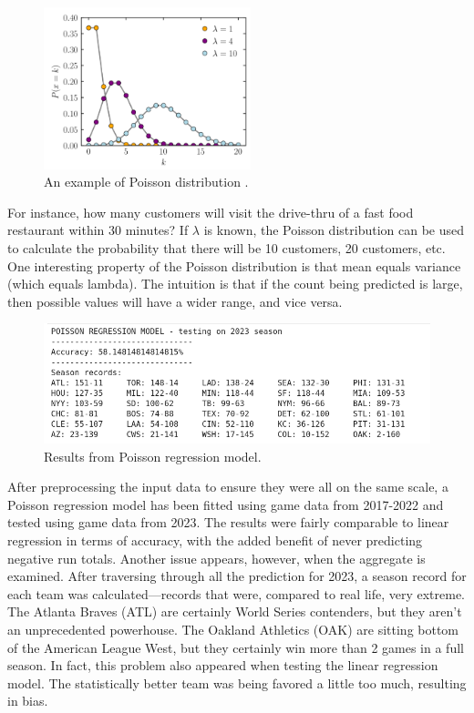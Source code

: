 \documentclass{paper}
\begin{document}
\begin{figure}[H]
  \centering
  \includegraphics[width=6cm]{fig13}
  \caption{An example of Poisson distribution \cite{poisreg}.}
\end{figure}

For instance, how many customers will visit the drive-thru of a fast food restaurant within 30 minutes? If $\lambda$ is known, the Poisson distribution can be used to calculate the probability that there will be 10 customers, 20 customers, etc. One interesting property of the Poisson distribution is that mean equals variance (which equals lambda). The intuition is that if the count being predicted is large, then possible values will have a wider range, and vice versa.

\begin{figure}[H]
  \centering
  \includegraphics[width=13cm]{fig5}
  \caption{Results from Poisson regression model.}
\end{figure}

After preprocessing the input data to ensure they were all on the same scale, a Poisson regression model has been fitted using game data from 2017-2022 and tested using game data from 2023. The results were fairly comparable to linear regression in terms of accuracy, with the added benefit of never predicting negative run totals. Another issue appears, however, when the aggregate is examined. After traversing through all the prediction for 2023, a season record for each team was calculated---records that were, compared to real life, very extreme. The Atlanta Braves (ATL) are certainly World Series contenders, but they aren't an unprecedented powerhouse. The Oakland Athletics (OAK) are sitting bottom of the American League West, but they certainly win more than 2 games in a full season. In fact, this problem also appeared when testing the linear regression model. The statistically better team was being favored a little too much, resulting in bias.
\end{document}
